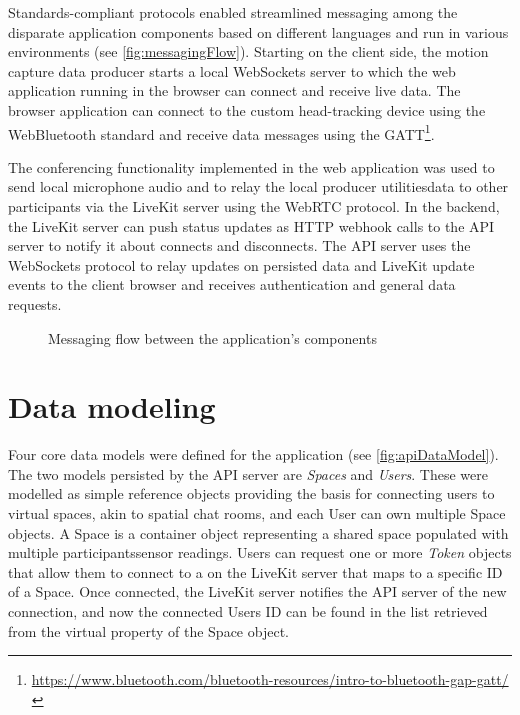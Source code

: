 Standards-compliant protocols enabled streamlined messaging among the disparate application components based on different languages and run in various environments (see \autoref{fig:messagingFlow}).
Starting on the client side, the motion capture data producer starts a local WebSockets server to which the web application running in the browser can connect and receive live data.
The browser application can connect to the custom head-tracking device using the WebBluetooth standard and receive data messages using the \ac{GATT}\footnote{\url{https://www.bluetooth.com/bluetooth-resources/intro-to-bluetooth-gap-gatt/}}.

The conferencing functionality implemented in the web application was used to send local microphone audio and to relay the local producer utilities\textquotesingle data to other participants via the LiveKit server using the WebRTC protocol.
In the backend, the LiveKit server can push status updates as \ac{HTTP} webhook calls to the \ac{API} server to notify it about connects and disconnects.
The \ac{API} server uses the WebSockets protocol to relay updates on persisted data and LiveKit update events to the client browser and receives authentication and general data requests.

\begin{figure}[!ht]
\centering

\caption[Application messaging flow]{Messaging flow between the application's components\protect}
\label{fig:messagingFlow}
\end{figure}

\section{Data modeling}
\label{sec:datamodeling}

Four core data models were defined for the application (see \autoref{fig:apiDataModel}).
The two models persisted by the \ac{API} server are \emph{Spaces} and \emph{Users}.
These were modelled as simple reference objects providing the basis for connecting users to virtual spaces, akin to spatial chat rooms, and each User can own multiple Space objects.
A Space is a container object representing a shared space populated with multiple participants\textquotesingle sensor readings.
Users can request one or more \emph{Token} objects that allow them to connect to a  on the LiveKit server that maps to a specific ID of a Space.
Once connected, the LiveKit server notifies the \ac{API} server of the new connection, and now the connected User\textquotesingle s ID can be found in the list retrieved from the virtual  property of the Space object.

